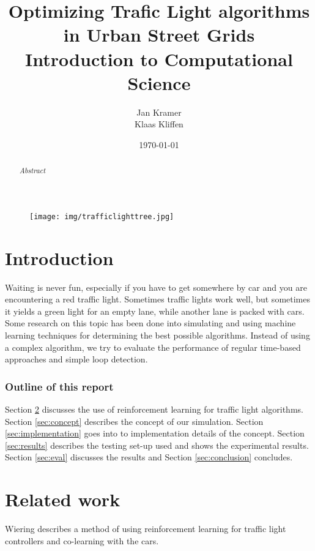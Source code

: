 \documentclass[a4paper,11pt]{article}
\title{Optimizing Trafic Light algorithms in Urban Street Grids\\
\large Introduction to Computational Science}
\author{Jan Kramer\\Klaas Kliffen}
\date{\today}
\begin{document}
\begin{titlepage}
\maketitle
\thispagestyle{empty}
\begin{abstract}
\textit{
 Abstract
}
\end{abstract}
\medskip\medskip
\begin{figure}[H]
  \centering
  \texttt{[image: img/trafficlighttree.jpg]}
\end{figure}


\end{titlepage}

\newpage
\tableofcontents

\newpage

\section{Introduction}
Waiting is never fun, especially if you have to get somewhere by car and you are encountering a red traffic light.
Sometimes traffic lights work well, but sometimes it yields a green light for an empty lane, while another lane is packed with cars.
Some research on this topic has been done into simulating and using machine learning techniques for determining the best
possible algorithms.
Instead of using a complex algorithm, we try to evaluate the performance of regular time-based approaches and simple loop detection.

\subsubsection*{Outline of this report}
Section \ref{sec:rel} discusses the use of reinforcement learning for traffic light algorithms.
Section \ref{sec:concept} describes the concept of our simulation.
Section \ref{sec:implementation} goes into to implementation details of the concept.
Section \ref{sec:results} describes the testing set-up used and shows the experimental results.
Section \ref{sec:eval} discusses the results and Section \ref{sec:conclusion} concludes.

\section{Related work}\label{sec:rel}

Wiering \cite{Wiering00} describes a method of using reinforcement learning for
traffic light controllers and co-learning with the cars.
\end{document}
